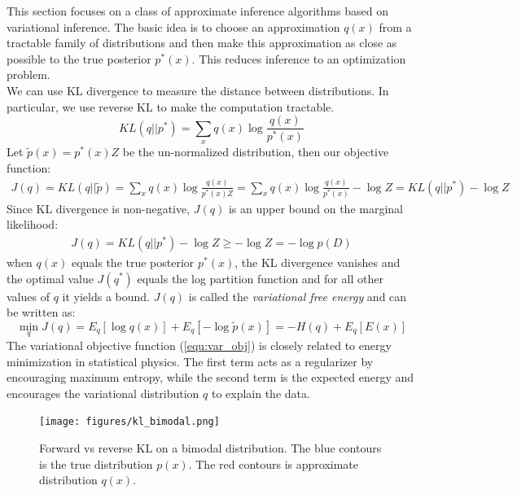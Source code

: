 This section focuses on a class of approximate inference algorithms based on variational inference. The basic idea is to choose an approximation $q(x)$ from a tractable family of distributions and then make this approximation as close as possible to the true posterior $p^{\ast}(x)$. This reduces inference to an optimization problem.\\

We can use KL divergence to measure the distance between distributions. In particular, we use reverse KL to make the computation tractable.
\begin{equation}
    KL(q||p^{\ast}) = \sum_x q(x) \log \frac{q(x)}{p^{\ast}(x)}
\end{equation}
Let $\tilde{p}(x)=p^{\ast}(x)Z$ be the un-normalized distribution, then our objective function:
\begin{eqnarray}
    J(q) = KL(q||\tilde{p})= \sum_x q(x) \log \frac{q(x)}{p^{\ast}(x)Z} 
    = \sum_x q(x) \log \frac{q(x)}{p^{\ast}(x)} - \log Z = KL(q||p^{\ast}) - \log Z
\end{eqnarray}
Since KL divergence is non-negative, $J(q)$ is an upper bound on the marginal likelihood:
\begin{eqnarray}
    J(q) = KL(q||p^{\ast}) - \log Z \geq -\log Z = -\log p(D)
\end{eqnarray}
when $q(x)$ equals the true posterior $p^{\ast}(x)$, the KL divergence vanishes and the optimal value $J(q^{\ast})$ equals the log partition function and for all other values of $q$ it yields a bound. $J(q)$ is called the \textit{variational free energy} and can be written as:
\begin{equation}\label{equ:var_obj}
   \min_q J(q) = E_{q}[\log q(x)]+E_{q}[-\log \tilde{p}(x)] = -H(q) + E_q[E(x)]
\end{equation}
The variational objective function (\ref{equ:var_obj}) is closely related to energy minimization in statistical physics. The first term acts as a regularizer by encouraging maximum entropy, while the second term is the expected energy and encourages the variational distribution $q$ to explain the data. 

\begin{figure}[tbhp]
    \centering
    \texttt{[image: figures/kl\_bimodal.png]}
    \caption{Forward vs reverse KL on a bimodal distribution. The blue contours is the true distribution $p(x)$. The red contours is approximate distribution $q(x)$.}
    \label{fig:kl_bimodal}
\end{figure}

